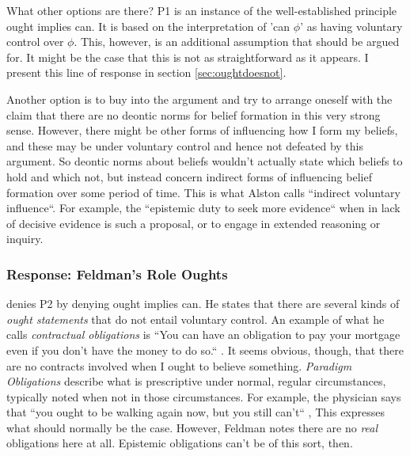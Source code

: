 \documentclass[12pt,numbers=noenddot]{scrartcl}
\begin{document}
What other options are there? P1 is an instance of the well-established principle ought implies can. It is based on the interpretation of 'can $\phi$' as having voluntary control over $\phi$. This, however, is an additional assumption that should be argued for. It might be the case that this is not as straightforward as it appears. I present this line of response in section \ref{sec:oughtdoesnot}.

Another option is to buy into the argument and try to arrange oneself with the claim that there are no deontic norms for belief formation in this very strong sense. However, there might be other forms of influencing how I form my beliefs, and these may be under voluntary control and hence not defeated by this argument. So deontic norms about beliefs wouldn't actually state which beliefs to hold and which not, but instead concern indirect forms of influencing belief formation over some period of time. This is what Alston calls “indirect voluntary influence“. For example, the “epistemic duty to seek more evidence“ \textcite{Hall1998-HALTED-2} when in lack of decisive evidence is such a proposal, or to engage in extended reasoning or inquiry.

\subsubsection{Response: Feldman's Role Oughts}

\textcite{Feldman2001-FELVBA} denies P2 by denying ought implies can. He states that there are several kinds of \emph{ought statements} that do not entail voluntary control. An example of what he calls \emph{contractual obligations} is “You can have an obligation to pay your mortgage even if you don't have the money to do so.“ \autocite[674]{Feldman2000-FELTEO-2}. It seems obvious, though, that there are no contracts involved when I ought to believe something. \emph{Paradigm Obligations} describe what is prescriptive under normal, regular circumstances, typically noted when not in those circumstances. For example, the physician says that “you ought to be walking again now, but you still can't“ \autocite[675]{Feldman2000-FELTEO-2}, This expresses what should normally be the case. However, Feldman notes there are no \emph{real} obligations here at all. Epistemic obligations can't be of this sort, then.
\end{document}
